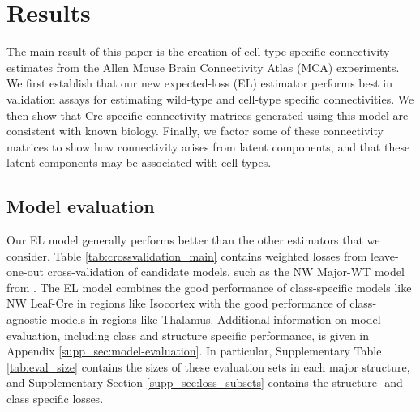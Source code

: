 \section{Results}
\label{sec:results}

The main result of this paper is the creation of cell-type specific connectivity estimates from the Allen Mouse Brain Connectivity Atlas (MCA) experiments.
We first establish that our new expected-loss (EL) estimator performs best in validation assays for estimating wild-type and cell-type specific connectivities.
We then show that Cre-specific connectivity matrices generated using this model are consistent with known biology. 
Finally, we factor some of these connectivity matrices to show how connectivity arises from latent components, and that these latent components may be associated with cell-types.

\subsection{Model evaluation}
\label{sec:model_eval}

Our EL model generally performs better than the other estimators that we consider.
Table \ref{tab:crossvalidation_main} contains weighted losses from leave-one-out cross-validation of candidate models, such as the NW Major-WT model from \citet{Knox2019-ot}.
The EL model combines the good performance of class-specific models like NW Leaf-Cre in regions like Isocortex with the good performance of class-agnostic models in regions like Thalamus.
Additional information on model evaluation, including class and structure specific performance, is given in Appendix \ref{supp_sec:model-evaluation}.
In particular, Supplementary Table \ref{tab:eval_size} contains the sizes of these evaluation sets in each major structure, and Supplementary Section \ref{supp_sec:loss_subsets} contains the structure- and class specific losses.


